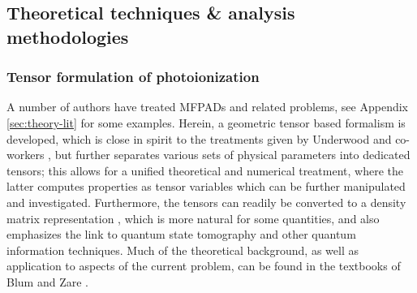 \subsection{Theoretical techniques \& analysis methodologies}



\subsubsection{Tensor formulation of photoionization}

A number of authors have treated MFPADs and related problems, see Appendix \ref{sec:theory-lit} for some examples. Herein, a geometric tensor based formalism is developed, which is close in spirit to the treatments given by Underwood and co-workers \cite{Reid2000, Stolow2008, Underwood2000}, but further separates various sets of physical parameters into dedicated tensors; this allows for a unified theoretical and numerical treatment, where the latter computes properties as tensor variables which can be further manipulated and investigated.%
Furthermore, the tensors can readily be converted to a density matrix representation \cite{BlumDensityMat, zareAngMom}, which is more natural for some quantities, and also emphasizes the link to quantum state tomography and other quantum information techniques. Much of the theoretical background, as well as application to aspects of the current problem, can be found in the textbooks of Blum \cite{BlumDensityMat} and Zare \cite{zareAngMom}.

